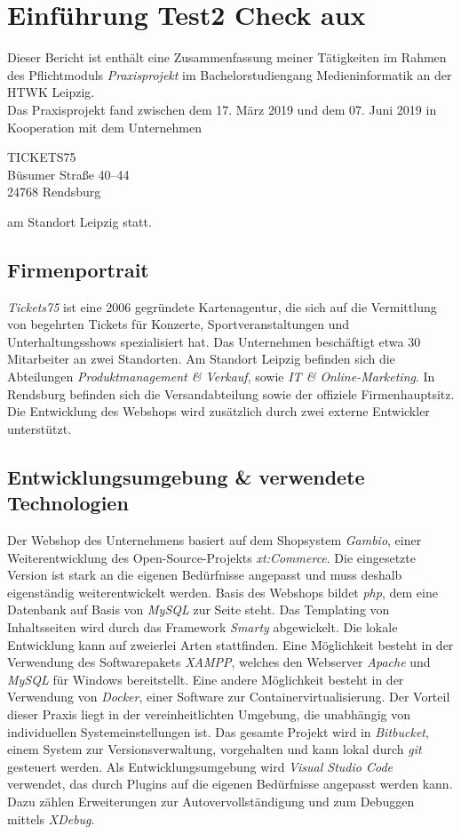 \chapter{Einführung Test2 Check aux}\label{ch:einführung}
Dieser Bericht ist enthält eine Zusammenfassung meiner Tätigkeiten im Rahmen des Pflichtmoduls \textit{Praxisprojekt} im Bachelorstudiengang Medieninformatik an der HTWK Leipzig.\\
Das Praxisprojekt fand zwischen dem 17. März 2019 und dem 07. Juni 2019 in Kooperation mit dem Unternehmen
\begin{center}
	TICKETS75\\
	Büsumer Straße 40–44\\
	24768 Rendsburg
\end{center}
am Standort Leipzig statt.

\section{Firmenportrait}
\textit{Tickets75} ist eine 2006 gegründete Kartenagentur, die sich auf die Vermittlung von begehrten Tickets für Konzerte, Sportveranstaltungen und Unterhaltungsshows spezialisiert hat.
Das Unternehmen beschäftigt etwa 30 Mitarbeiter an zwei Standorten. Am Standort Leipzig befinden sich die Abteilungen \textit{Produktmanagement \& Verkauf}, sowie \textit{IT \& Online-Marketing}. 
In Rendsburg befinden sich die Versandabteilung sowie der offiziele Firmenhauptsitz. Die Entwicklung des Webshops wird zusätzlich durch zwei externe Entwickler
unterstützt.

\section{Entwicklungsumgebung \& verwendete Technologien}
Der Webshop des Unternehmens basiert auf dem Shopsystem \textit{Gambio}, einer Weiterentwicklung des Open-Source-Projekts \textit{xt:Commerce}. 
Die eingesetzte Version ist stark an die eigenen Bedürfnisse angepasst und muss deshalb eigenständig weiterentwickelt werden. Basis des Webshops bildet \textit{php}, 
dem eine Datenbank auf Basis von \textit{MySQL} zur Seite steht. Das Templating von Inhaltsseiten wird durch das Framework \textit{Smarty} abgewickelt. 
Die lokale Entwicklung kann auf zweierlei Arten stattfinden. Eine Möglichkeit besteht in der Verwendung des Softwarepakets \textit{XAMPP}, 
welches den Webserver \textit{Apache} und \textit{MySQL} für Windows bereitstellt. Eine andere Möglichkeit besteht in der Verwendung von \textit{Docker}, 
einer Software zur Containervirtualisierung. Der Vorteil dieser Praxis liegt in der vereinheitlichten Umgebung, die unabhängig von individuellen Systemeinstellungen ist. 
Das gesamte Projekt wird in \textit{Bitbucket}, einem System zur Versionsverwaltung, vorgehalten und kann lokal durch \textit{git} gesteuert werden. 
Als Entwicklungsumgebung wird \textit{Visual Studio Code} verwendet, das durch Plugins auf die eigenen Bedürfnisse angepasst werden kann. 
Dazu zählen Erweiterungen zur Autovervollständigung und zum Debuggen mittels \textit{XDebug}.

